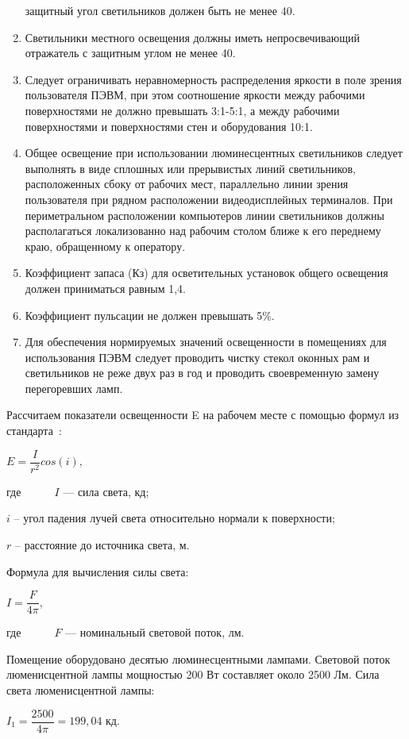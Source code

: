 \begin{enumerate}
 защитный угол светильников должен быть не менее 40\textdegree{}.
 \item Светильники местного освещения должны иметь непросвечивающий отражатель с защитным углом не менее 40\textdegree{}.
 \item Следует ограничивать неравномерность распределения яркости в поле зрения пользователя ПЭВМ, 
 при этом соотношение яркости между рабочими поверхностями не должно превышать 3:1-5:1, 
 а между рабочими поверхностями и поверхностями стен и оборудования 10:1.
 \item Общее освещение при использовании люминесцентных светильников следует 
 выполнять в виде сплошных или прерывистых линий светильников, расположенных сбоку от рабочих мест, 
 параллельно линии зрения пользователя при рядном расположении видеодисплейных терминалов. 
 При периметральном расположении компьютеров линии светильников должны располагаться локализованно 
 над рабочим столом ближе к его переднему краю, обращенному к оператору.
 \item Коэффициент запаса (Кз) для осветительных установок общего освещения должен приниматься равным 1,4.
 \item Коэффициент пульсации не должен превышать 5\%.
 \item Для обеспечения нормируемых значений освещенности в помещениях для использования 
 ПЭВМ следует проводить чистку стекол оконных рам и светильников не реже двух раз в год и 
 проводить своевременную замену перегоревших ламп.
\end{enumerate}


Рассчитаем показатели освещенности E на рабочем месте с помощью формул из стандарта~\cite{gost_8995}:
\begin{center}
$E = \dfrac{I}{r^{2}}cos(i),$
\end{center}
где~~~~~\ $\textit{I}$ --- сила света, кд;

$\textit{i}$ -- угол падения лучей света относительно нормали к поверхности;

$\textit{r}$ -- расстояние до источника света, м.

Формула для вычисления силы света:
\begin{center}
$I = \dfrac{F}{4\pi},$
\end{center}
где~~~~~\ $\textit{F}$ --- номинальный световой поток, лм.

Помещение оборудовано десятью люминесцентными лампами.
Световой поток люменисцентной лампы мощностью 200 Вт составляет около 2500 Лм.
Сила света люменисцентной лампы:
\begin{center}
$I_{1} = \dfrac{2500}{4\pi}= 199,04$ кд.
\end{center}

